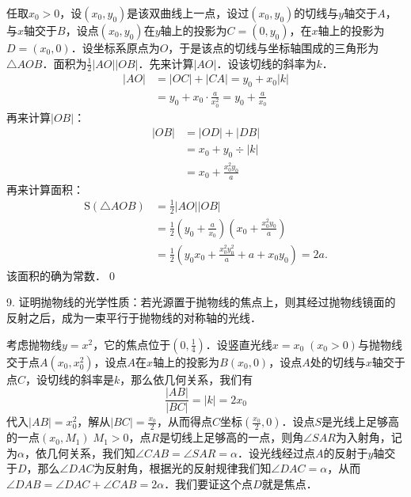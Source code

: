 \prove 任取$x_0 > 0$，设$(x_0,y_0)$是该双曲线上一点，设过$(x_0,y_0)$的切线与$y$轴交于$A$，与$x$轴交于$B$，设点$(x_0,y_0)$在$y$轴上的投影为$C=(0,y_0)$，在$x$轴上的投影为$D=(x_0,0)$．设坐标系原点为$O$，于是该点的切线与坐标轴围成的三角形为$\triangle AOB$．面积为$\displaystyle\frac{1}{2}\lvert AO \rvert \lvert OB \rvert$．先来计算$\lvert AO \rvert$．设该切线的斜率为$k$．
\begin{align}
    \lvert AO \rvert &= \lvert OC \rvert + \lvert CA \rvert = y_0 + x_0 \lvert k \rvert \\
    &= y_0 + x_0 \cdot \frac{a}{x_0^2} = y_0 + \frac{a}{x_0}
\end{align}
再来计算$\lvert OB \rvert$：
\begin{align}
    \lvert OB \rvert &= \lvert OD \rvert + \lvert DB \rvert \\
    &= x_0 + y_0 \div \lvert k \rvert \\
    &= x_0 + \frac{x_0^2 y_0}{a}
\end{align}
再来计算面积：
\begin{align}
    \mathrm{S}(\triangle AOB) &= \frac{1}{2} \lvert AO \rvert \lvert OB \rvert \\
    &= \frac{1}{2} \left(y_0 + \frac{a}{x_0}\right)\left(x_0+\frac{x_0^2y_0}{a}\right) \\
    &= \frac{1}{2} \left(y_0 x_0 + \frac{x_0^2y_0^2}{a} + a + x_0y_0\right) = 2a.
\end{align}
该面积的确为常数．\qed\bigskip

9. 证明抛物线的光学性质：若光源置于抛物线的焦点上，则其经过抛物线镜面的反射之后，成为一束平行于抛物线的对称轴的光线．

\prove 考虑抛物线$y = x^2$，它的焦点位于$(0, \displaystyle\frac{1}{4})$．设竖直光线$x = x_0 \; (x_0 > 0)$与抛物线交于点$A(x_0, x_0^2)$，设点$A$在$x$轴上的投影为$B(x_0, 0)$，设点$A$处的切线与$x$轴交于点$C$，设切线的斜率是$k$，那么依几何关系，我们有
\begin{equation}
    \frac{\lvert AB \rvert}{\lvert BC \rvert} = \lvert k \rvert = 2x_0
\end{equation}
代入$\lvert AB \rvert = x_0^2$，解从$\lvert BC \rvert = \displaystyle\frac{x_0}{2}$，从而得点$C$坐标$(\displaystyle\frac{x_0}{2},0)$．设点$S$是光线上足够高的一点$(x_0, M_1) \; M_1 > 0$，点$R$是切线上足够高的一点，则角$\angle SAR$为入射角，记为$\alpha$，依几何关系，我们知$\angle CAB = \angle SAR = \alpha$．设光线经过点$A$的反射于$y$轴交于$D$，那么$\angle DAC$为反射角，根据光的反射规律我们知$\angle DAC = \alpha$，从而$\angle DAB = \angle DAC + \angle CAB = 2\alpha$．我们要证这个点$D$就是焦点．

